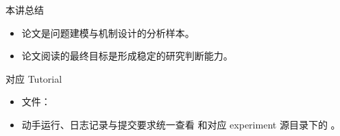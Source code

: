 \begin{frame}{本讲总结}
  \begin{itemize}
    \item 论文是问题建模与机制设计的分析样本。
    \item 论文阅读的最终目标是形成稳定的研究判断能力。
  \end{itemize}
\end{frame}

\begin{frame}{对应 Tutorial}
  \begin{itemize}
    \item 文件：\texttt{}
    \item 动手运行、日志记录与提交要求统一查看 \texttt{} 和对应 experiment 源目录下的 \texttt{}。
  \end{itemize}
\end{frame}

